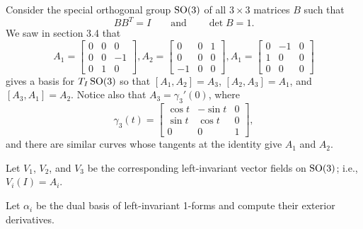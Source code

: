 \documentclass[12pt]{memoir}
\begin{document}
\begin{ptcbr}

\end{ptcbr}
\begin{Ej}
    Consider the special orthogonal group $\operatorname{SO}(3)$ of all $3 \times 3$ matrices $B$ such that 
	\[
		B B^T = I \qquad \text{and} \qquad \det B = 1.
	\]
	We saw in section 3.4 that
	\[
		A_1 = \begin{bmatrix} 0 & 0 & 0 \\ 0 & 0 & -1 \\ 0 & 1 & 0 \end{bmatrix}, A_2 = \begin{bmatrix} 0 & 0 & 1 \\ 0 & 0 & 0 \\ -1 & 0 & 0 \end{bmatrix}, A_1 = \begin{bmatrix} 0 & -1 & 0 \\ 1 & 0 & 0 \\ 0 & 0 & 0 \end{bmatrix}
	\]
	gives a basis for $T_I\operatorname{SO}(3)$ so that $[A_1, A_2]=A_3$, $[A_2,A_3]=A_1$, and $[A_3,A_1]=A_2$. Notice also that $A_3 = \gamma_3'(0)$, where
	\[
		\gamma_3(t) = \begin{bmatrix} \cos t & -\sin t & 0 \\ \sin t & \cos t & 0 \\ 0 & 0 & 1 \end{bmatrix},
	\]
	and there are similar curves whose tangents at the identity give $A_1$ and $A_2$.
	
	Let $V_1$, $V_2$, and $V_3$ be the corresponding left-invariant vector fields on $\operatorname{SO}(3)$; i.e., $V_i(I)=A_i$.
	
	Let $\alpha_i$ be the dual basis of left-invariant 1-forms and compute their exterior derivatives. 
\end{Ej}
\begin{ptcbr}

\end{ptcbr}
\end{document}
